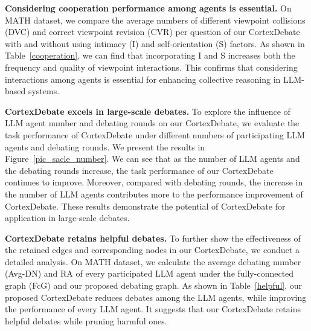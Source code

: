 

\textbf{Considering cooperation performance among agents is essential.} On MATH dataset, we compare the average numbers of different viewpoint collisions (DVC) and correct viewpoint revision (CVR) per question of our CortexDebate with and without using intimacy (I) and self-orientation (S) factors. As shown in Table~\ref{cooperation}, we can find that incorporating I and S increases both the frequency and quality of viewpoint interactions. This confirms that considering interactions among agents is essential for enhancing collective reasoning in LLM-based systems.


\textbf{CortexDebate excels in large-scale debates.} To explore the influence of LLM agent number and debating rounds on our CortexDebate, we evaluate the task performance of CortexDebate under different numbers of participating LLM agents and debating rounds. We present the results in Figure~\ref{pic_sacle_number}. We can see that as the number of LLM agents and the debating rounds increase, the task performance of our CortexDebate continues to improve. Moreover, compared with debating rounds, the increase in the number of LLM agents contributes more to the performance improvement of CortexDebate. These results demonstrate the potential of CortexDebate for application in large-scale debates.


\textbf{CortexDebate retains helpful debates.} To further show the effectiveness of the retained edges and corresponding nodes in our CortexDebate, we conduct a detailed analysis. On MATH dataset, we calculate the average debating number (Avg-DN) and RA of every participated LLM agent under the fully-connected graph (FcG) and our proposed debating graph. As shown in Table~\ref{helpful}, our proposed CortexDebate reduces debates among the LLM agents, while improving the performance of every LLM agent. It suggests that our CortexDebate retains helpful debates while pruning harmful ones.